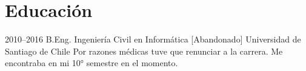 \documentclass[espanol]{cv-style}
\begin{document}
\section{Educación}

\begin{entrylist}
  \entry
  {2010--2016}
  {B.Eng. {\normalfont Ingeniería Civil en Informática [Abandonado]}}
  {Universidad de Santiago de Chile}
  {Por razones médicas tuve que renunciar a la carrera. Me encontraba en 
  mi 10° semestre en el momento.}
\end{entrylist}




\end{document}
